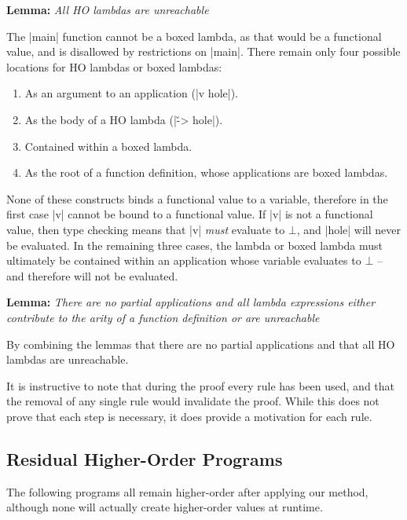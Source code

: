 \documentclass[preprint]{sigplanconf}
\newenvironment{lemma}[1]
    {\smallskip
     \noindent\textbf{Lemma:} \textit{#1}}
    {\noexample}
\begin{document}
\begin{lemma}{All HO lambdas are unreachable}

The |main| function cannot be a boxed lambda, as that would be a functional value, and is disallowed by restrictions on |main|. There remain only four possible locations for HO lambdas or boxed lambdas:

\begin{enumerate}
\item As an argument to an application (|v hole|).
\item As the body of a HO lambda (|\v -> hole|).
\item Contained within a boxed lambda.
\item As the root of a function definition, whose applications are boxed lambdas.
\end{enumerate}

None of these constructs binds a functional value to a variable, therefore in the first case |v| cannot be bound to a functional value. If |v| is not a functional value, then type checking means that |v| \textit{must} evaluate to $\bot{}$, and |hole| will never be evaluated. In the remaining three cases, the lambda or boxed lambda must ultimately be contained within an application whose variable evaluates to $\bot{}$ -- and therefore will not be evaluated.
\end{lemma}

\begin{lemma}{There are no partial applications and all lambda expressions either contribute to the arity of a function definition or are unreachable}

By combining the lemmas that there are no partial applications and that all HO lambdas are unreachable.
\end{lemma}

\smallskip

It is instructive to note that during the proof every rule has been used, and that the removal of any single rule would invalidate the proof. While this does not prove that each step is necessary, it does provide a motivation for each rule.

\subsection{Residual Higher-Order Programs}
\label{sec:example_residual}

The following programs all remain higher-order after applying our method, although none will actually create higher-order values at runtime.
\end{document}

